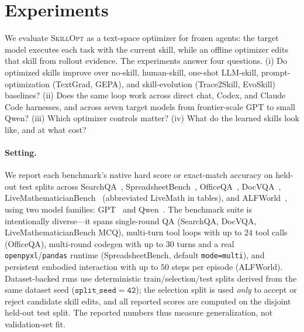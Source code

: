 \documentclass{llmxive}
\providecommand{\ourmethod}{\textsc{SkillOpt}\xspace}
\providecommand{\na}{--}
\providecommand{\harnessrow}[1]{\rowcolor{black!7}\multicolumn{8}{l}{\textbf{#1}}}
\providecommand{\methodcell}[1]{\cellcolor{blue!8}#1}
\providecommand{\ablationbenchmarkheader}{\textbf{Setting} & \textbf{SearchQA} & \textbf{Spreadsheet} & \textbf{LiveMath} \\}
\begin{document}
\providecommand{\ourmethod}{\textsc{SkillOpt}}
\providecommand{\na}{--}
\providecommand{\harnessrow}[1]{\rowcolor{black!7}\multicolumn{8}{l}{\textbf{#1}}}
\providecommand{\methodcell}[1]{\cellcolor{blue!8}#1}
\providecommand{\ablationbenchmarkheader}{\textbf{Setting} & \textbf{SearchQA} & \textbf{Spreadsheet} & \textbf{LiveMath} \\}

\section{Experiments}
\label{sec:experiments}

We evaluate \ourmethod{} as a text-space optimizer for frozen agents: the target model executes each task with the current skill, while an offline optimizer edits that skill from rollout evidence. The experiments answer four questions. (i) Do optimized skills improve over no-skill, human-skill, one-shot LLM-skill, prompt-optimization (TextGrad, GEPA), and skill-evolution (Trace2Skill, EvoSkill) baselines? (ii) Does the same loop work across direct chat, Codex, and Claude Code harnesses, and across seven target models from frontier-scale GPT to small Qwen? (iii) Which optimizer controls matter? (iv) What do the learned skills look like, and at what cost?

\paragraph{Setting.}
We report each benchmark's native hard score or exact-match accuracy on held-out test splits across SearchQA~\citep{dunn2017searchqa}, SpreadsheetBench~\citep{spreadsheetbench}, OfficeQA~\citep{opsahl2026officeqa}, DocVQA~\citep{mathew2021docvqa}, LiveMathematicianBench~\citep{he2026livemathematicianbenchlivebenchmarkmathematicianlevel} (abbreviated LiveMath in tables), and ALFWorld~\citep{alfworld}, using two model families: GPT~\citep{openai2026gpt54} and Qwen~\citep{qwen3.5,qwen36_35b_a3b}. The benchmark suite is intentionally diverse---it spans single-round QA (SearchQA, DocVQA, LiveMathematicianBench MCQ), multi-turn tool loops with up to $24$ tool calls (OfficeQA), multi-round codegen with up to $30$ turns and a real \texttt{openpyxl}/\texttt{pandas} runtime (SpreadsheetBench, default \texttt{mode=multi}), and persistent embodied interaction with up to $50$ steps per episode (ALFWorld). Dataset-backed runs use deterministic train/selection/test splits derived from the same dataset seed ($\mathtt{split\_seed=42}$); the selection split is used \emph{only} to accept or reject candidate skill edits, and all reported scores are computed on the disjoint held-out test split. The reported numbers thus measure generalization, not validation-set fit.
\end{document}
